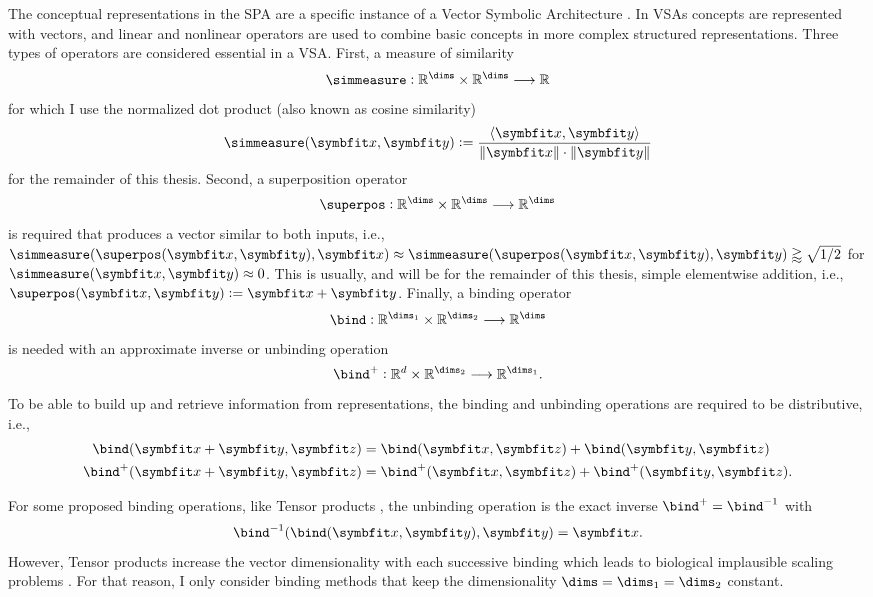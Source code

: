 The conceptual representations in the SPA are a specific instance of a Vector Symbolic Architecture \parencite[VSA;][]{gayler2004}.
In VSAs concepts are represented with vectors, and linear and nonlinear operators are used to combine basic concepts in more complex structured representations.
Three types of operators are considered essential in a VSA\@.
First, a measure of similarity
\begin{equation}
    \simmeasure: \mathbb{R}^{\dims} \times \mathbb{R}^{\dims} \longrightarrow \mathbb{R}
\end{equation}
for which I use the normalized dot product (also known as cosine similarity)
\begin{equation}
    \simmeasure(\vc x, \vc y) := \frac{\left\langle \vc x, \vc y \right\rangle}{\|\vc x\| \cdot \|\vc y\|}
\end{equation}
for the remainder of this thesis.
Second, a superposition operator
\begin{equation}
    \superpos: \mathbb{R}^{\dims} \times \mathbb{R}^{\dims} \longrightarrow \mathbb{R}^{\dims}
\end{equation}
is required that produces a vector similar to both inputs, i.e., $\simmeasure(\superpos(\vc x, \vc y), \vc x) \approx \simmeasure(\superpos(\vc x, \vc y), \vc y) \gtrapprox \sqrt{1/2}$ for $\simmeasure(\vc x, \vc y) \approx 0$.
This is usually, and will be for the remainder of this thesis, simple elementwise addition, i.e., $\superpos(\vc x, \vc y) := \vc x + \vc y$.
Finally, a binding operator
\begin{equation}
    \bind: \mathbb{R}^{\dims_1} \times \mathbb{R}^{\dims_2} \longrightarrow \mathbb{R}^{\dims}
\end{equation}
is needed with an approximate inverse or unbinding operation
\begin{equation}
    \bind^+: \mathbb{R}^d \times \mathbb{R}^{\dims_2} \longrightarrow \mathbb{R}^{\dims_1} \text{.}
\end{equation}
To be able to build up and retrieve information from representations, the binding and unbinding operations are required to be distributive, i.e.,
\begin{align}
    \bind(\vc x + \vc y, \vc z) &= \bind(\vc x, \vc z) + \bind(\vc y, \vc z) \\
    \bind^+(\vc x + \vc y, \vc z) &= \bind^+(\vc x, \vc z) + \bind^+(\vc y, \vc z) \text{.}
\end{align}

For some proposed binding operations, like Tensor products \parencite{smolensky1990}, the unbinding operation is the exact inverse $\bind^+ = \bind^{-1}$ with
\begin{equation*}
    \bind^{-1}(\bind(\vc x, \vc y), \vc y) = \vc x \text{.}
\end{equation*}
However, Tensor products increase the vector dimensionality with each successive binding which leads to biological implausible scaling problems \parencite[Appendix D.5]{eliasmith2013}.
For that reason, I only consider binding methods that keep the dimensionality $\dims = \dims_1 = \dims_2$ constant.

